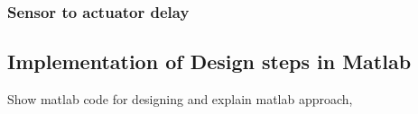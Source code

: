 \subsubsection{Sensor to actuator delay}
\label{sec:stad}

\subsection{Implementation of Design steps in Matlab}
\color{red}
Show matlab code for designing and explain matlab approach,
\color{black}